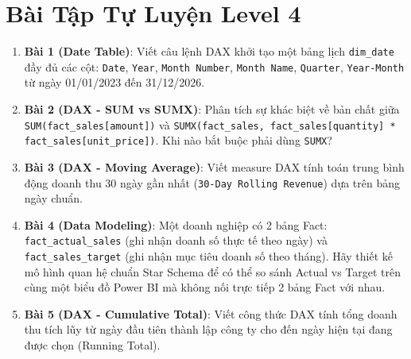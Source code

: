 \section{Bài Tập Tự Luyện Level 4}

\begin{baitapbox}
\begin{enumerate}
    \item \textbf{Bài 1 (Date Table)}: Viết câu lệnh DAX khởi tạo một bảng lịch \texttt{dim\_date} đầy đủ các cột: \texttt{Date}, \texttt{Year}, \texttt{Month Number}, \texttt{Month Name}, \texttt{Quarter}, \texttt{Year-Month} từ ngày 01/01/2023 đến 31/12/2026.
    \item \textbf{Bài 2 (DAX - SUM vs SUMX)}: Phân tích sự khác biệt về bản chất giữa \texttt{SUM(fact\_sales[amount])} và \texttt{SUMX(fact\_sales, fact\_sales[quantity] * fact\_sales[unit\_price])}. Khi nào bắt buộc phải dùng \texttt{SUMX}?
    \item \textbf{Bài 3 (DAX - Moving Average)}: Viết measure DAX tính toán trung bình động doanh thu 30 ngày gần nhất (\texttt{30-Day Rolling Revenue}) dựa trên bảng ngày chuẩn.
    \item \textbf{Bài 4 (Data Modeling)}: Một doanh nghiệp có 2 bảng Fact: \texttt{fact\_actual\_sales} (ghi nhận doanh số thực tế theo ngày) và \texttt{fact\_sales\_target} (ghi nhận mục tiêu doanh số theo tháng). Hãy thiết kế mô hình quan hệ chuẩn Star Schema để có thể so sánh Actual vs Target trên cùng một biểu đồ Power BI mà không nối trực tiếp 2 bảng Fact với nhau.
    \item \textbf{Bài 5 (DAX - Cumulative Total)}: Viết công thức DAX tính tổng doanh thu tích lũy từ ngày đầu tiên thành lập công ty cho đến ngày hiện tại đang được chọn (Running Total).
\end{enumerate}
\end{baitapbox}

